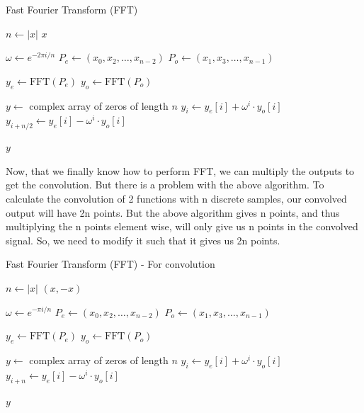 \documentclass[12pt]{article}
\begin{document}
\begin{algorithm}[!ht]
\caption{Fast Fourier Transform (FFT)}
\begin{algorithmic}[1]
    \State $n \gets |x|$ 
        \State \Return $x$
    \EndIf
    
    \State $\omega \gets e^{-2\pi i / n}$ 
    \State $P_e \gets (x_0, x_2, \ldots, x_{n-2})$ 
    \State $P_o \gets (x_1, x_3, \ldots, x_{n-1})$ 
    
    \State $y_e \gets \text{FFT}(P_e)$ 
    \State $y_o \gets \text{FFT}(P_o)$ 
    
    \State $y \gets $ complex array of zeros of length $n$ 
        \State $y_i \gets y_e[i] + \omega^i \cdot y_o[i]$ 
        \State $y_{i+n/2} \gets y_e[i] - \omega^i \cdot y_o[i]$ 
    \EndFor
    
    \State \Return $y$
\EndProcedure
\end{algorithmic}
\end{algorithm}

Now, that we finally know how to perform FFT, we can multiply the outputs to get the convolution. But there is a problem with the above algorithm. To calculate the convolution of 2 functions with n discrete samples, our convolved output will have 2n points. But the above algorithm gives n points, and thus multiplying the n points element wise, will only give us n points in the convolved signal. So, we need to modify it such that it gives us 2n points.


\begin{algorithm}[!ht]
\caption{Fast Fourier Transform (FFT) - For convolution}
\begin{algorithmic}[1]
    \State $n \gets |x|$ 
    \State \Return $(x, -x)$
    \EndIf
    
    \State $\omega \gets e^{-\pi i / n}$ 
    \State $P_e \gets (x_0, x_2, \ldots, x_{n-2})$ 
    \State $P_o \gets (x_1, x_3, \ldots, x_{n-1})$ 
    
    \State $y_e \gets \text{FFT}(P_e)$ 
    \State $y_o \gets \text{FFT}(P_o)$ 
    
    \State $y \gets $ complex array of zeros of length $n$ 
        \State $y_i \gets y_e[i] + \omega^i \cdot y_o[i]$ 
        \State $y_{i+n} \gets y_e[i] - \omega^i \cdot y_o[i]$ 
    \EndFor
    
    \State \Return $y$
\EndProcedure
\end{algorithmic}
\end{algorithm}
\end{document}
